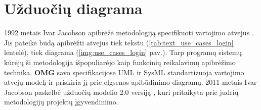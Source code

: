 \section{\textbf{Užduočių diagrama}}

1992 metais Ivar Jacobson apibrėžė metodologiją specifikuoti vartojimo atvejus \cite{Jacobson1992}. Jis pateikė būdą apibrėžti atvejus tiek tekstu (\ref{tab:text_use_cases_login} lentelė), tiek diagrama (\ref{img:use_cases_login} pav.). Tarp programų sistemų kūrėjų ši metodologija išpopuliarėjo kaip funkcinių reikalavimų apibrėžimo technika. \textbf{OMG} savo specifikacijose UML \cite{omgUmlFormal} ir SysML \cite{OMGSysML} standartizuoja vartojimo atvejų modelį ir priskiria jį prie elgsenos apibūdinimo diagramų. 2011 metais Ivar Jacobson paskelbė užduočių modelio 2.0 versiją \cite{jacobson2011usecase}, kuri pritaikyta prie judrių metodologijų projektų įgyvendinimo.


